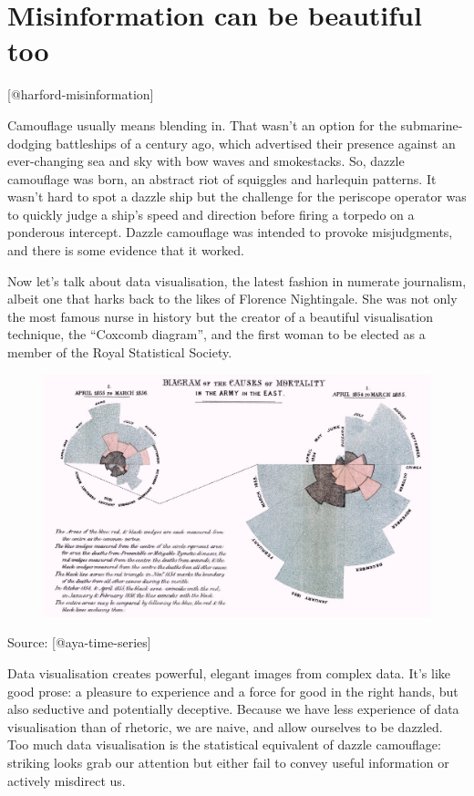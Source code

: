 \documentclass[]{book}
\theoremstyle{definition}
\theoremstyle{definition}
\theoremstyle{definition}
\theoremstyle{remark}
\begin{document}
\section{Misinformation can be beautiful
too}\label{misinformation-can-be-beautiful-too}

{[}@harford-misinformation{]}

Camouflage usually means blending in. That wasn't an option for the
submarine-dodging battleships of a century ago, which advertised their
presence against an ever-changing sea and sky with bow waves and
smokestacks. So, dazzle camouflage was born, an abstract riot of
squiggles and harlequin patterns. It wasn't hard to spot a dazzle ship
but the challenge for the periscope operator was to quickly judge a
ship's speed and direction before firing a torpedo on a ponderous
intercept. Dazzle camouflage was intended to provoke misjudgments, and
there is some evidence that it worked.

Now let's talk about data visualisation, the latest fashion in numerate
journalism, albeit one that harks back to the likes of Florence
Nightingale. She was not only the most famous nurse in history but the
creator of a beautiful visualisation technique, the ``Coxcomb diagram'',
and the first woman to be elected as a member of the Royal Statistical
Society.

\begin{figure}
\centering
\includegraphics{images/aya-polar.jpg}
\caption{}
\end{figure}

Source: {[}@aya-time-series{]}

Data visualisation creates powerful, elegant images from complex data.
It's like good prose: a pleasure to experience and a force for good in
the right hands, but also seductive and potentially deceptive. Because
we have less experience of data visualisation than of rhetoric, we are
naive, and allow ourselves to be dazzled. Too much data visualisation is
the statistical equivalent of dazzle camouflage: striking looks grab our
attention but either fail to convey useful information or actively
misdirect us.
\end{document}
